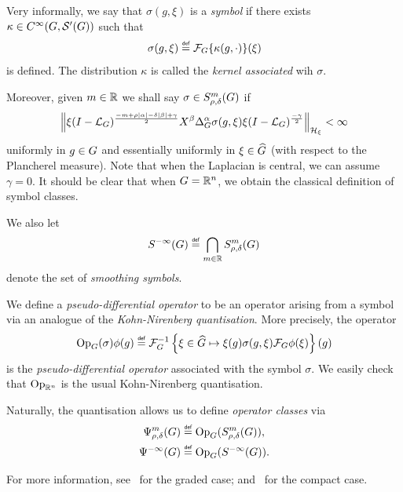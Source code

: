 Very informally,
we say that $\sigma(g, \xi)$ is a \emph{symbol} if there exists $\kappa \in \SmoothFunctions {\Group, \TemperedDistributions \Group}$ such that
\begin{align*}
    \sigma(g, \xi) \defeq \Fourier \{\kappa(g, \dummy)\}(\xi)
\end{align*}
is defined.
The distribution $\kappa$ is called the \emph{kernel associated} wih $\sigma$.

Moreover,
given $m \in \R$
we shall say $\sigma \in \SymbolClass m {\rho, \delta}$ if
\begin{align*}
    \norm [\mathcal H_\xi] {%
        \xi \BesselPotential {-m + \rho \abs \alpha - \delta \abs \beta + \gamma}
        \LeftDifferentialOperator \beta \DifferenceOperatorOrder \alpha \sigma(g, \xi)
        \xi \BesselPotential {-\gamma}
    }
    < \infty
\end{align*}
uniformly in $g \in \Group$
and essentially uniformly in $\xi \in \dualGroup \Group$ (with respect to the Plancherel measure).
Note that when the Laplacian is central,
we can assume $\gamma = 0$.
It should be clear that when $\Group = \R^n$,
we obtain the classical definition of symbol classes.

We also let
\begin{align*}
    \SmoothingSymbols \defeq \bigcap_{m \in \R} \SymbolClass m {\rho, \delta}
\end{align*}
denote the set of \emph{smoothing symbols}.

We define a \emph{pseudo-differential operator} to be an operator arising from a symbol via an analogue of the \emph{Kohn-Nirenberg quantisation}.
More precisely,
the operator
\begin{align*}
    \Op(\sigma) \phi(g)
    \defeq \InverseFourier \left\{ \xi \in \dualGroup \Group \mapsto \xi(g) \sigma(g, \xi) \Fourier \phi(\xi)\right\}(g)
\end{align*}
is the \emph{pseudo-differential operator} associated with the symbol $\sigma$.
We easily check that $\Op [\R^n]$ is the usual Kohn-Nirenberg quantisation.

Naturally,
the quantisation allows us to define \emph{operator classes} via
\begin{align*}
    \OperatorClass m {\rho, \delta} &\defeq \Op(\SymbolClass m {\rho, \delta}),\\
    \SmoothingOperators &\defeq \Op(\SmoothingSymbols).
\end{align*}

For more information,
see~\cite[Section 5.1]{FischerRuzhansky16} for the graded case;
and~\cite[Section 3.1]{Fischer2015} for the compact case.

